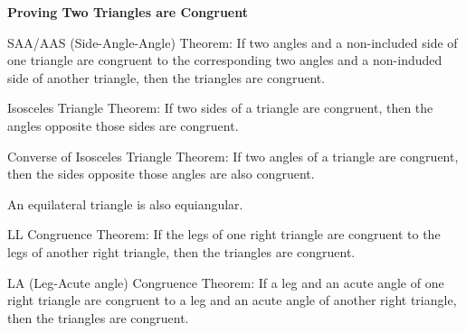 \begin{center}
\textbf{Proving Two Triangles are Congruent 
}
\end{center}

\vspce

SAA/AAS (Side-Angle-Angle) Theorem: 
If two angles and a non-included side of one triangle are congruent to the corresponding two angles and a non-induded side of another triangle, then the triangles are congruent.

\vspce 

Isosceles Triangle Theorem:  
If two sides of a triangle are congruent, then the angles opposite those sides are congruent.

\vspce 

Converse of Isosceles Triangle Theorem:  If two angles of a triangle are congruent, then the sides opposite those angles are also congruent.

\vspce 

An equilateral triangle is also equiangular. 

\vspce 

LL  Congruence Theorem:  If  the  legs  of  one  right  triangle  are  congruent  to  the  legs  of  another  right  triangle,  then the triangles are congruent.

\vspce 

LA (Leg-Acute angle) Congruence Theorem:  If  a  leg  and  an  acute  angle  of  one  right  triangle  are  congruent  to  a  leg  and  an  acute angle of another right triangle, then the triangles are congruent.

